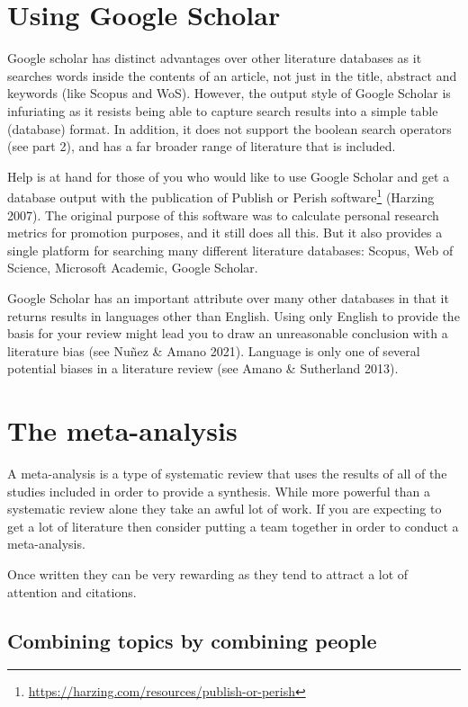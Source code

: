 \documentclass[
]{krantz}
\renewcommand{\href}[2]{#2\footnote{\url{#1}}}
\begin{document}
\hypertarget{using-google-scholar}{%
\section{Using Google Scholar}\label{using-google-scholar}}

Google scholar has distinct advantages over other literature databases as it searches words inside the contents of an article, not just in the title, abstract and keywords (like Scopus and WoS). However, the output style of Google Scholar is infuriating as it resists being able to capture search results into a simple table (database) format. In addition, it does not support the boolean search operators (see part 2), and has a far broader range of literature that is included.

Help is at hand for those of you who would like to use Google Scholar and get a database output with the publication of \href{https://harzing.com/resources/publish-or-perish}{Publish or Perish software} (Harzing 2007). The original purpose of this software was to calculate personal research metrics for promotion purposes, and it still does all this. But it also provides a single platform for searching many different literature databases: Scopus, Web of Science, Microsoft Academic, Google Scholar.

Google Scholar has an important attribute over many other databases in that it returns results in languages other than English. Using only English to provide the basis for your review might lead you to draw an unreasonable conclusion with a literature bias (see Nuñez \& Amano 2021). Language is only one of several potential biases in a literature review (see Amano \& Sutherland 2013).

\hypertarget{the-meta-analysis}{%
\section{The meta-analysis}\label{the-meta-analysis}}

A meta-analysis is a type of systematic review that uses the results of all of the studies included in order to provide a synthesis. While more powerful than a systematic review alone they take an awful lot of work. If you are expecting to get a lot of literature then consider putting a team together in order to conduct a meta-analysis.

Once written they can be very rewarding as they tend to attract a lot of attention and citations.

\hypertarget{combining-topics-by-combining-people}{%
\subsection{Combining topics by combining people}\label{combining-topics-by-combining-people}}
\end{document}
